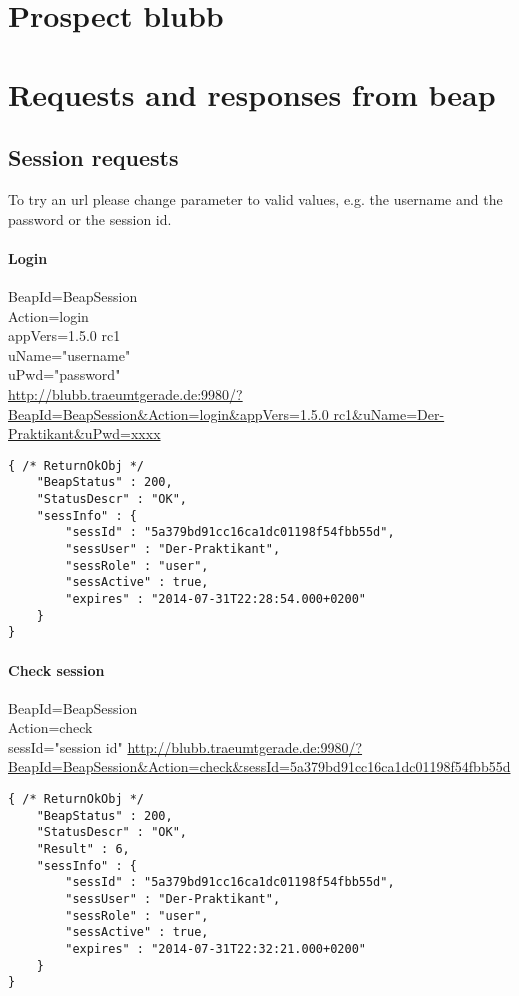 \documentclass[12pt,a4paper,oneside]{report}
\begin{document}
\chapter{Prospect blubb}

\printbibliography
%

\appendix
\chapter{Requests and responses from beap}
\lstset{language=JavaScript}
\section{Session requests}
To try an url please change parameter to valid values, e.g. the username and the password or the session id.
\subsubsection{Login}
BeapId=BeapSession\\
Action=login\\
appVers=1.5.0 rc1\\
uName="username"\\
uPwd="password"\\
\url{http://blubb.traeumtgerade.de:9980/?BeapId=BeapSession&Action=login&appVers=1.5.0 rc1&uName=Der-Praktikant&uPwd=xxxx}
\lstset{language=JavaScript}
\begin{lstlisting}
{ /* ReturnOkObj */
    "BeapStatus" : 200,
    "StatusDescr" : "OK",
    "sessInfo" : { 
        "sessId" : "5a379bd91cc16ca1dc01198f54fbb55d",
        "sessUser" : "Der-Praktikant",
        "sessRole" : "user",
        "sessActive" : true,
        "expires" : "2014-07-31T22:28:54.000+0200"
    }
}
\end{lstlisting}
\clearpage
\subsubsection{Check session}
BeapId=BeapSession\\
Action=check\\
sessId="session id"
\url{http://blubb.traeumtgerade.de:9980/?BeapId=BeapSession&Action=check&sessId=5a379bd91cc16ca1dc01198f54fbb55d}
\lstset{language=JavaScript}
\begin{lstlisting}
{ /* ReturnOkObj */
    "BeapStatus" : 200,
    "StatusDescr" : "OK",
    "Result" : 6,
    "sessInfo" : { 
        "sessId" : "5a379bd91cc16ca1dc01198f54fbb55d",
        "sessUser" : "Der-Praktikant",
        "sessRole" : "user",
        "sessActive" : true,
        "expires" : "2014-07-31T22:32:21.000+0200"
    }
}
\end{lstlisting}
\end{document}
